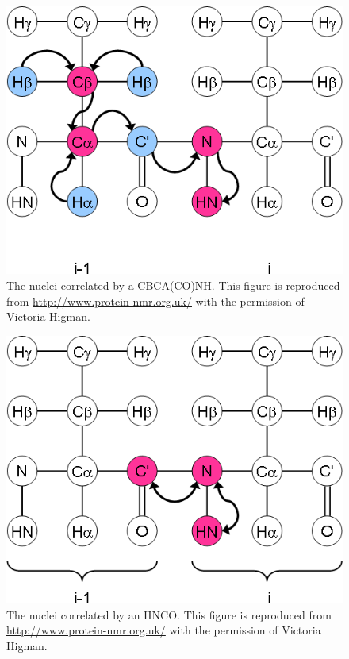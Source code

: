 \begin{figure}
  \includegraphics[scale=0.75]{figures/ccpn_cbcaconh}
  \caption[The nuclei correlated by a CBCA(CO)NH.]
          {The nuclei correlated by a CBCA(CO)NH.
           This figure is reproduced from \url{http://www.protein-nmr.org.uk/}
           with the permission of Victoria Higman.}
  \label{ccpn_cbcaconh}
\end{figure}

\begin{figure}
  \includegraphics[scale=0.75]{figures/ccpn_hnco}
  \caption[The nuclei correlated by an HNCO.]
          {The nuclei correlated by an HNCO.
           This figure is reproduced from \url{http://www.protein-nmr.org.uk/}
           with the permission of Victoria Higman.}
  \label{ccpn_hnco}
\end{figure}

